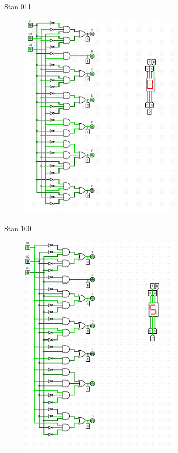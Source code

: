 \documentclass[]{article}
\begin{document}
\newpage
Stan 011
\begin{figure}[H]
	\centering
	\includegraphics[width=0.7\textwidth]{CZTERY_011.png}
\end{figure}
\newpage
Stan 100
\begin{figure}[H]
	\centering
	\includegraphics[width=0.7\textwidth]{CZTERY_100.png}
\end{figure}
\end{document}
